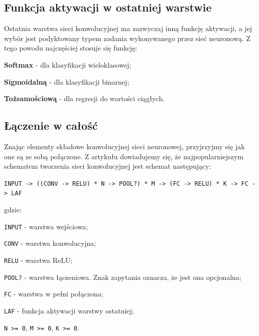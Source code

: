 \subsection{Funkcja aktywacji w ostatniej warstwie}
Ostatnia warstwa sieci konwolucyjnej ma zazwyczaj inną funkcję aktywacji, a jej wybór jest podyktowany typem zadania wykonywanego przez sieć neuronową. Z tego powodu najczęściej stosuje się funkcję:
\vspace{-0.3cm}
\begin{enumerate*}
\item \textbf{Softmax} \cite{wood:whatIsSoftmax} - dla klasyfikacji wieloklasowej;
\item \textbf{Sigmoidalną} \cite{saeed:sigmoidIntroduction} - dla klasyfikacji binarnej;
\item \textbf{Tożsamościową} - dla regresji do wartości ciągłych.
\end{enumerate*}

\subsection{Łączenie w całość}
Znając elementy składowe konwolucyjnej sieci neuronowej, przyjrzyjmy się jak one są ze sobą połączone. Z artykułu \cite{stanford:cnnCourse} dowiadujemy się, że najpopularniejszym schematem tworzenia sieci konwolucyjnej jest schemat następujący:

\noindent \texttt{INPUT -> ((CONV -> RELU) * N -> POOL?) * M -> (FC -> RELU) * K -> FC -> LAF}

\noindent gdzie:
\vspace{-0.5cm}
\begin{itemize*}
\item \texttt{INPUT} - warstwa wejściowa;
\item \texttt{CONV} - warstwa konwolucyjna;
\item \texttt{RELU} - warstwa ReLU;
\item \texttt{POOL?} - warstwa łączeniowa. Znak zapytania oznacza, że jest ona opcjonalna;
\item \texttt{FC} - warstwa w pełni połączona;
\item \texttt{LAF} - funkcja aktywacji warstwy ostatniej;
\item \texttt{N >= 0}, \texttt{M >= 0}, \texttt{K >= 0}.
\end{itemize*}

